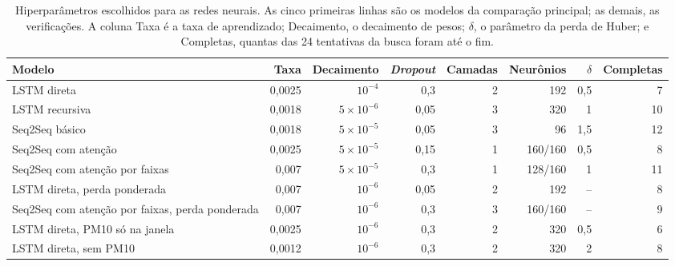 \begin{table}[!htbp]
    \centering
    \caption[Hiperparâmetros escolhidos para as redes neurais]{Hiperparâmetros escolhidos para as redes neurais. As cinco primeiras linhas são os modelos da comparação principal; as demais, as verificações. A coluna Taxa é a taxa de aprendizado; Decaimento, o decaimento de pesos; $\delta$, o parâmetro da perda de Huber; e Completas, quantas das 24 tentativas da busca foram até o fim.}
    \label{tab:hpo_melhores}
    \small
    \setlength{\tabcolsep}{4pt}
    \begin{tabular}{>{\raggedright\arraybackslash}p{}rrrrrrr}
        \toprule
        Modelo & Taxa & Decaimento & \textit{Dropout} & Camadas & Neurônios & $\delta$ & Completas \\
        \midrule
        LSTM direta & 0,0025 & $10^{-4}$ & 0,3 & 2 & 192 & 0,5 & 7 \\
        LSTM recursiva & 0,0018 & $5\times10^{-6}$ & 0,05 & 3 & 320 & 1 & 10 \\
        Seq2Seq básico & 0,0018 & $5\times10^{-5}$ & 0,05 & 3 & 96 & 1,5 & 12 \\
        Seq2Seq com atenção & 0,0025 & $5\times10^{-5}$ & 0,15 & 1 & 160/160 & 0,5 & 8 \\
        Seq2Seq com atenção por faixas & 0,007 & $5\times10^{-5}$ & 0,3 & 1 & 128/160 & 1 & 11 \\
        \midrule
        LSTM direta, perda ponderada & 0,007 & $10^{-6}$ & 0,05 & 2 & 192 & -- & 8 \\
        Seq2Seq com atenção por faixas, perda ponderada & 0,007 & $10^{-6}$ & 0,3 & 3 & 160/160 & -- & 9 \\
        LSTM direta, PM10 só na janela & 0,0025 & $10^{-6}$ & 0,3 & 2 & 320 & 0,5 & 6 \\
        LSTM direta, sem PM10 & 0,0012 & $10^{-6}$ & 0,3 & 2 & 320 & 2 & 8 \\
        \bottomrule
    \end{tabular}
\end{table}

